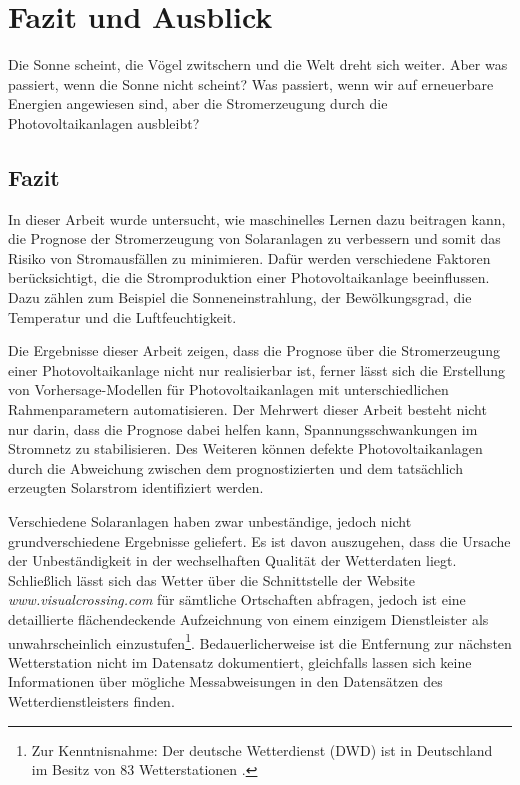 \documentclass[12pt, a4paper]{article}
\begin{document}
\newpage

\section{Fazit und Ausblick}
\label{sec:conclusion_outlook}

Die Sonne scheint, die Vögel zwitschern und die Welt dreht sich weiter. Aber was passiert, wenn die Sonne nicht scheint? Was passiert, wenn wir auf erneuerbare Energien angewiesen sind, aber die Stromerzeugung durch die Photovoltaikanlagen ausbleibt? 

\subsection{Fazit}

In dieser Arbeit wurde untersucht, wie maschinelles Lernen dazu beitragen kann, die Prognose der Stromerzeugung von Solaranlagen zu verbessern und somit das Risiko von Stromausfällen zu minimieren. Dafür werden verschiedene Faktoren berücksichtigt, die die Stromproduktion einer Photovoltaikanlage beeinflussen. Dazu zählen zum Beispiel die Sonneneinstrahlung, der Bewölkungsgrad, die Temperatur und die Luftfeuchtigkeit.

Die Ergebnisse dieser Arbeit zeigen, dass die Prognose über die Stromerzeugung einer Photovoltaikanlage nicht nur realisierbar ist, ferner lässt sich die Erstellung von Vorhersage-Modellen für Photovoltaikanlagen mit unterschiedlichen Rahmenparametern automatisieren. Der Mehrwert dieser Arbeit besteht nicht nur darin, dass die Prognose dabei helfen kann, Spannungsschwankungen im Stromnetz zu stabilisieren. Des Weiteren können defekte Photovoltaikanlagen durch die Abweichung zwischen dem prognostizierten und dem tatsächlich erzeugten Solarstrom identifiziert werden.

Verschiedene Solaranlagen haben zwar unbeständige, jedoch nicht grundverschiedene Ergebnisse geliefert. Es ist davon auszugehen, dass die Ursache der Unbeständigkeit in der wechselhaften Qualität der Wetterdaten liegt. Schließlich lässt sich das Wetter über die Schnittstelle der Website \textit{www.visualcrossing.com} für sämtliche Ortschaften abfragen, jedoch ist eine detaillierte flächendeckende Aufzeichnung von einem einzigem Dienstleister als unwahrscheinlich einzustufen\footnote{Zur Kenntnisnahme: Der deutsche Wetterdienst (DWD) ist in Deutschland im Besitz von 83 Wetterstationen \cite{ws:dwdweatherstations}.}. Bedauerlicherweise ist die Entfernung zur nächsten Wetterstation nicht im Datensatz dokumentiert, gleichfalls lassen sich keine Informationen über mögliche Messabweisungen in den Datensätzen des Wetterdienstleisters finden.
\end{document}
